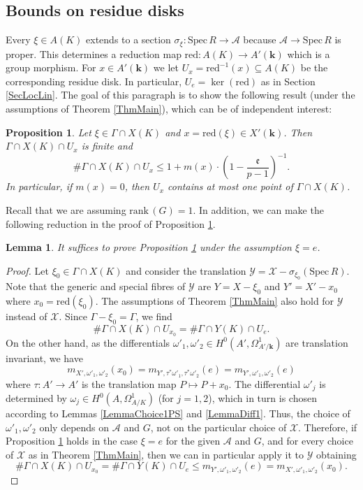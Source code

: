 \documentclass[11pt]{amsart}
\newtheorem{lemma}[theorem]{Lemma}
\newtheorem{proposition}[theorem]{Proposition}
\theoremstyle{remark}
\numberwithin{equation}{section}
\newcommand{\efrak}{\mathfrak{e}}
\newcommand{\Acal}{\mathscr{A}}
\newcommand{\Xcal}{\mathscr{X}}
\newcommand{\Ycal}{\mathscr{Y}}
\newcommand{\kk}{\mathbf{k}}
\newcommand{\Spec}{\mathrm{Spec}\,}
\newcommand{\rk}{\mathrm{rank}\,}
\newcommand{\red}{\mathrm{red}}
\begin{document}


\subsection{Bounds on residue disks}\label{SecResDisk} %



Every $\xi\in A(K)$ extends to a section $\sigma_\xi:\Spec R\to \Acal$ because $\Acal\to \Spec R$ is proper. This determines a reduction map $\red: A(K)\to A'(\kk)$ which is a group morphism. For $x\in A'(\kk)$ we let $U_x=\red^{-1}(x)\subseteq A(K)$ be the corresponding residue disk. In particular, $U_e=\ker(\red)$ as in Section \ref{SecLocLin}. The goal of this paragraph is to show the following result (under the assumptions of Theorem \ref{ThmMain}), which can be of independent interest:

\begin{proposition}\label{PropKeyU} Let $\xi\in \Gamma\cap X(K)$ and  $x=\red(\xi)\in X'(\kk)$. Then $\Gamma\cap X(K)\cap U_x$ is finite and
$$
\# \Gamma\cap X(K)\cap U_x\le 1+ m(x)\cdot  \left(1-\frac{\efrak}{p-1}\right)^{-1}.
$$
In particular, if $m(x)=0$, then $U_x$ contains at most one point of $\Gamma\cap X(K)$.
\end{proposition}

Recall that we are assuming $\rk(G)=1$. In addition, we can make the following reduction in the proof of Proposition \ref{PropKeyU}.

\begin{lemma}\label{LemmaXY} It suffices to prove Proposition \ref{PropKeyU} under the assumption $\xi=e$.
\end{lemma} 
\begin{proof} Let $\xi_0\in \Gamma\cap X(K)$ and consider the translation $\Ycal=\Xcal- \sigma_{\xi_0}(\Spec R)$. Note that the generic and special fibres of $\Ycal$ are $Y=X-\xi_0$ and $Y'=X'-x_0$ where $x_0=\red(\xi_0)$. The assumptions of Theorem \ref{ThmMain} also hold for $\Ycal$ instead of $\Xcal$. Since $\Gamma-\xi_0=\Gamma$, we find 
$$
\# \Gamma\cap X(K)\cap U_{x_0} = \# \Gamma \cap Y(K)\cap U_e.
$$ 
On the other hand, as the differentials $\omega'_1,\omega'_2\in H^0(A',\Omega^1_{A'/\kk})$ are translation invariant, we have 
$$
m_{X',\omega'_1,\omega'_2}(x_0)=m_{Y',\tau^*\omega'_1,\tau^*\omega'_2}(e)=m_{Y',\omega'_1,\omega'_2}(e)
$$ 
where $\tau:A'\to A'$ is the translation map $P\mapsto P+x_0$. The differential $\omega'_j$ is determined by $\omega_j\in H^0(A, \Omega^1_{A/K})$ (for $j=1,2$), which in turn is chosen according to Lemmas \ref{LemmaChoice1PS} and  \ref{LemmaDiff1}. Thus, the choice of $\omega'_1,\omega'_2$  only depends on $\Acal$ and $G$, not on the particular choice of $\Xcal$. Therefore, if Proposition \ref{PropKeyU} holds in the case $\xi=e$ for the given $\Acal$ and $G$, and for every choice of $\Xcal$ as in Theorem \ref{ThmMain}, then we can in particular apply it to $\Ycal$ obtaining 
$$
\# \Gamma\cap X(K)\cap U_{x_0} = \# \Gamma \cap Y(K)\cap U_e\le m_{Y',\omega'_1,\omega'_2}(e)=m_{X',\omega'_1,\omega'_2}(x_0).
$$
\end{proof}
\end{document}
